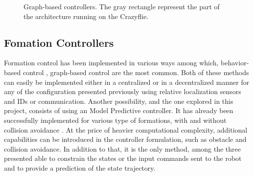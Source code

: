 \documentclass[a4paper, 12pt]{report}
\begin{document}
\begin{figure}[htbp]
\centering
{}
\hspace{0.2cm}
\caption{Graph-based controllers. The gray rectangle represent the part of the architecture running on the Crazyflie.}
\label{fig:controlArchi}
\end{figure}

\subsection{Fomation Controllers}

Formation control has been implemented in various ways among which, behavior-based control \cite{Arkin1999, Mataric2002, Pugh2009}, graph-based control  \cite{Gowal2013, Falconi2010} are the most common. Both of these methods can easily be implemented either in a centralized or in a decentralized manner for any of the configuration presented previously using relative localization sensors and IDs or communication. Another possibility, and the one explored in this project, consists of using an Model Predictive controller. It has already been successfully implemented for various type of formations, with and without collision avoidance \cite{Manikonda1999, Chao2011, Wang2007, Lim2009, Kuriki2015,Dunbar2002,Fukushima2013,Shin2009,Zhao2014,Chao2012}. At the price of heavier computational complexity, additional capabilities can be introduced in the controller formulation, such as obstacle and collision avoidance. In addition to that, it is the only method, among the three presented able to constrain the states or the input commands sent to the robot and to provide a prediction of the state trajectory.
\end{document}
